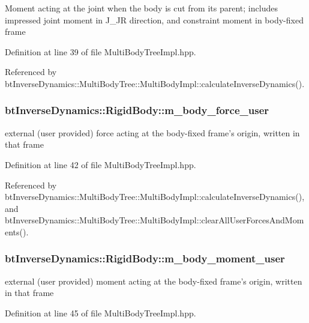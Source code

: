 Moment acting at the joint when the body is cut from its parent; includes impressed joint moment in J\_\-JR direction, and constraint moment in body-fixed frame 

Definition at line 39 of file MultiBodyTreeImpl.hpp.

Referenced by btInverseDynamics::MultiBodyTree::MultiBodyImpl::calculateInverseDynamics().\hypertarget{structbt_inverse_dynamics_1_1_rigid_body_c0d70c45cc5e1876fb7aba320293a7fb}{
\subsubsection[m\_\-body\_\-force\_\-user]{ {\bf btInverseDynamics::RigidBody::m\_\-body\_\-force\_\-user}}}
\label{structbt_inverse_dynamics_1_1_rigid_body_c0d70c45cc5e1876fb7aba320293a7fb}


external (user provided) force acting at the body-fixed frame's origin, written in that frame 

Definition at line 42 of file MultiBodyTreeImpl.hpp.

Referenced by btInverseDynamics::MultiBodyTree::MultiBodyImpl::calculateInverseDynamics(), and btInverseDynamics::MultiBodyTree::MultiBodyImpl::clearAllUserForcesAndMoments().\hypertarget{structbt_inverse_dynamics_1_1_rigid_body_2525b72b49dff7c73e9d4056e6e13411}{
\subsubsection[m\_\-body\_\-moment\_\-user]{ {\bf btInverseDynamics::RigidBody::m\_\-body\_\-moment\_\-user}}}
\label{structbt_inverse_dynamics_1_1_rigid_body_2525b72b49dff7c73e9d4056e6e13411}


external (user provided) moment acting at the body-fixed frame's origin, written in that frame 

Definition at line 45 of file MultiBodyTreeImpl.hpp.

